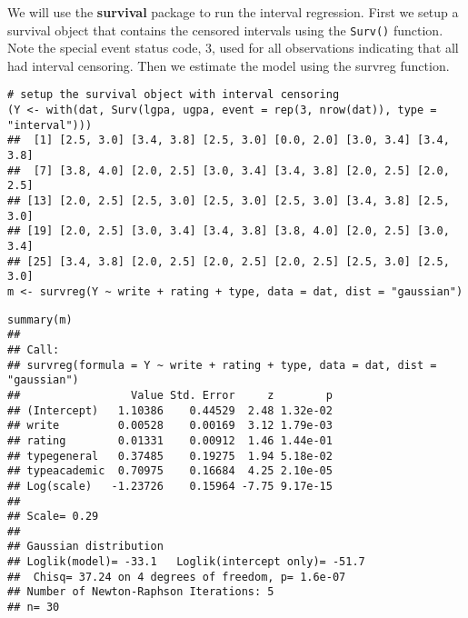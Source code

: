 \documentclass[a4paper,12pt]{article}
\begin{document}
We will use the \textbf{survival} package to run the interval regression. First we setup a survival object that contains the censored intervals using the \texttt{Surv()} function. Note the special event status code, 3, used for all observations indicating that all had interval censoring. Then we estimate the model using the survreg function.
{
	\normalsize
\begin{framed}
\begin{verbatim}
# setup the survival object with interval censoring
(Y <- with(dat, Surv(lgpa, ugpa, event = rep(3, nrow(dat)), type = "interval")))
##  [1] [2.5, 3.0] [3.4, 3.8] [2.5, 3.0] [0.0, 2.0] [3.0, 3.4] [3.4, 3.8]
##  [7] [3.8, 4.0] [2.0, 2.5] [3.0, 3.4] [3.4, 3.8] [2.0, 2.5] [2.0, 2.5]
## [13] [2.0, 2.5] [2.5, 3.0] [2.5, 3.0] [2.5, 3.0] [3.4, 3.8] [2.5, 3.0]
## [19] [2.0, 2.5] [3.0, 3.4] [3.4, 3.8] [3.8, 4.0] [2.0, 2.5] [3.0, 3.4]
## [25] [3.4, 3.8] [2.0, 2.5] [2.0, 2.5] [2.0, 2.5] [2.5, 3.0] [2.5, 3.0]
m <- survreg(Y ~ write + rating + type, data = dat, dist = "gaussian")
\end{verbatim}
\end{framed}
}
\begin{framed}
\begin{verbatim}summary(m)
## 
## Call:
## survreg(formula = Y ~ write + rating + type, data = dat, dist = "gaussian")
##                 Value Std. Error     z        p
## (Intercept)   1.10386    0.44529  2.48 1.32e-02
## write         0.00528    0.00169  3.12 1.79e-03
## rating        0.01331    0.00912  1.46 1.44e-01
## typegeneral   0.37485    0.19275  1.94 5.18e-02
## typeacademic  0.70975    0.16684  4.25 2.10e-05
## Log(scale)   -1.23726    0.15964 -7.75 9.17e-15
## 
## Scale= 0.29 
## 
## Gaussian distribution
## Loglik(model)= -33.1   Loglik(intercept only)= -51.7
## 	Chisq= 37.24 on 4 degrees of freedom, p= 1.6e-07 
## Number of Newton-Raphson Iterations: 5 
## n= 30
\end{verbatim}
\end{framed}
\end{document}

